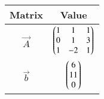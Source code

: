 \begin{tabular}{|c|c|}
\hline
\textbf{Matrix} & \textbf{Value} \\
\hline
$\vec{A}$ & $\begin{pmatrix}1 & 1 & 1 \\ 0 & 1 & 3 \\ 1 & -2 & 1\end{pmatrix}$ \\
\hline
$\vec{b}$ & $\begin{pmatrix}6 \\ 11 \\ 0\end{pmatrix}$ \\
\hline
\end{tabular}
